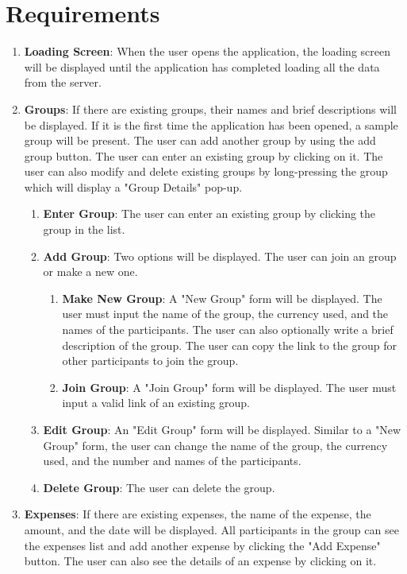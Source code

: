 \documentclass[conference]{IEEEtran}
\begin{document}
\section{Requirements}

\begin{enumerate}
    \item \textbf {Loading Screen}: When the user opens the application, the loading screen will be displayed until the application has completed loading all the data from the server.
    \item \textbf {Groups}: If there are existing groups, their names and brief descriptions will be displayed. If it is the first time the application has been opened, a sample group will be present. The user can add another group by using the add group button. The user can enter an existing group by clicking on it. The user can also modify and delete existing groups by long-pressing the group which will display a "Group Details" pop-up.
    \begin{enumerate}
        \item \textbf{Enter Group}: The user can enter an existing group by clicking the group in the list.
        \item \textbf{Add Group}: Two options will be displayed. The user can join an group or make a new one.
            \begin{enumerate}
                \item\textbf {Make New Group}: A "New Group" form will be displayed. The user must input the name of the group, the currency used, and the names of the participants. The user can also optionally write a brief description of the group. The user can copy the link to the group for other participants to join the group.
                \item\textbf {Join Group}: A "Join Group" form will be displayed. The user must input a valid link of an existing group.
            \end {enumerate}
        \item \textbf{Edit Group}: An "Edit Group" form will be displayed. Similar to a "New Group" form, the user can change the name of the group, the currency used, and the number and names of the participants.
        \item \textbf{Delete Group}: The user can delete the group.
    \end{enumerate}
    \item \textbf {Expenses}: If there are existing expenses, the name of the expense, the amount, and the date will be displayed. All participants in the group can see the expenses list and add another expense by clicking the "Add Expense" button. The user can also see the details of an expense by clicking on it.

\end{enumerate}
\end{document}
